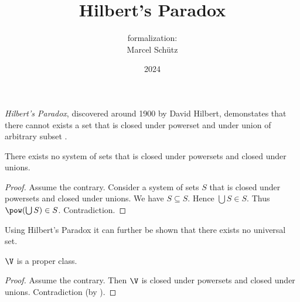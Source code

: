 \documentclass{article}
\title{Hilbert's Paradox}
\author{\Naproche formalization:\\[0.5em]Marcel Schütz}
\date{2024}
\begin{document}
  \maketitle


  \noindent \emph{Hilbert's Paradox}, discovered around 1900 by David Hilbert, 
  demonstates that there cannot exists a set that is closed under powerset and 
  under union of arbitrary subset \cite{PeckhausKahl2002}.

  \begin{forthel}
    \begin{theorem*}[title=Hilbert's Paradox,id=hilbert_paradox]
      There exists no system of sets that is closed under powersets and closed under unions.
    \end{theorem*}
    \begin{proof}
      Assume the contrary.
      Consider a system of sets $S$ that is closed under powersets and closed under unions.
      We have $S \subseteq S$.
      Hence $\bigcup S \in S$.
      Thus $\pow(\bigcup S) \in S$.
      Contradiction.
    \end{proof}
  \end{forthel}

  \noindent Using Hilbert's Paradox it can further be shown that there exists 
  no universal set.

  \begin{forthel}
    \begin{corollary*}[id=hilbert_paradox_corollary]
      $\V$ is a proper class.
    \end{corollary*}
    \begin{proof}
      Assume the contrary.
      Then $\V$ is closed under powersets and closed under unions.
      Contradiction (by ).
    \end{proof}
  \end{forthel}

  \printbibliography
\end{document}

